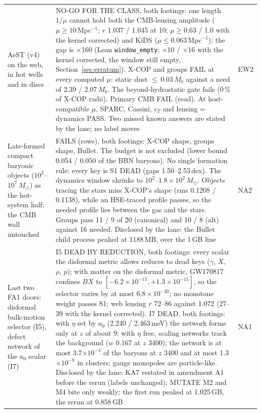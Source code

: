 \documentclass[10pt]{article}
\begin{document}
\begin{longtable}{@{}p{4.4cm}p{8.6cm}p{2.8cm}@{}}
AeST (v4) on the web, in hot wells and in discs & NO-GO FOR THE CLASS, both footings: one length $1/\mu$ cannot hold both the CMB-lensing amplitude ($\mu\ge10$\,Mpc$^{-1}$; $r$ 1.037 / 1.045 at 10; $\mu\ge0.63$ / 1.0 with the kernel corrected) and KiDS ($\mu\le0.063$\,Mpc$^{-1}$); the gap is $\times$160 (Lean \texttt{window\_empty}; $\times$10 / $\times$16 with the kernel corrected, the window still empty, Section~\ref{sec:erratum}). X-COP and groups FAIL at every computed $\mu$: static dust $\le$\,0.03\,$M_b$ against a need of 2.39 / 2.07\,$M_b$. The beyond-hydrostatic gate fails (0\,\% of X-COP radii). Primary CMB FAIL (read). At host-compatible $\mu$, SPARC, Cassini, $c_T$ and lensing = dynamics PASS. Two missed known answers are stated by the lane; no label moves & EW2\\
Late-formed compact baryonic objects ($10^2$--$10^7\,M_\odot$) as the hot-system half; the CMB wall untouched & FAILS (rows), both footings: X-COP shape, groups shape, Bullet. The budget is not excluded (lower bound 0.054 / 0.050 of the BBN baryons). No single formation rule: every key is S1 DEAD (gaps 1.50--2.53\,dex). The dynamics window shrinks to $10^2$--$1.8\times10^2\,M_\odot$. Objects tracing the stars miss X-COP's shape (rms 0.1208 / 0.1138), while an HSE-traced profile passes, so the needed profile lies between the gas and the stars. Groups pass 11 / 9 of 20 (canonical) and 10 / 8 (alt) against 16 needed. Disclosed by the lane: the Bullet child process peaked at 1188\,MB, over the 1\,GB line & NA2\\
Last two FA1 doors: disformal bulk-motion selector (I5), defect network of the $a_0$ scalar (I7) & I5 DEAD BY REDUCTION, both footings: every scalar the disformal metric allows reduces to dead keys ($\gamma$, $X$, $\rho$, $p$); with matter on the disformal metric, GW170817 confines $BX$ to $[-6.2\times10^{-15},+1.3\times10^{-15}]$, so the selector varies by at most $6.8\times10^{-20}$; no monotone weight passes S1; web lensing $r$ 72--86 against 1.072 (27--39 with the kernel corrected). I7 DEAD, both footings: with $\eta$ set by $a_0$ (2.240 / 2.463\,meV) the network forms only at $z$ of about 9; with $\eta$ free, scaling networks track the background ($w$ 0.167 at $z$ 3400); the network is at most 3.7$\times10^{-4}$ of the baryons at $z$ 3400 and at most 1.3$\times10^{-8}$ in clusters; gauge monopoles are particle-like. Disclosed by the lane: KA7 restated in amendment A1 before the rerun (labels unchanged); MUTATE M2 and M4 bite only weakly; the first run peaked at 1.025\,GB, the rerun at 0.858\,GB & NA1\\

\end{longtable}
\end{document}
